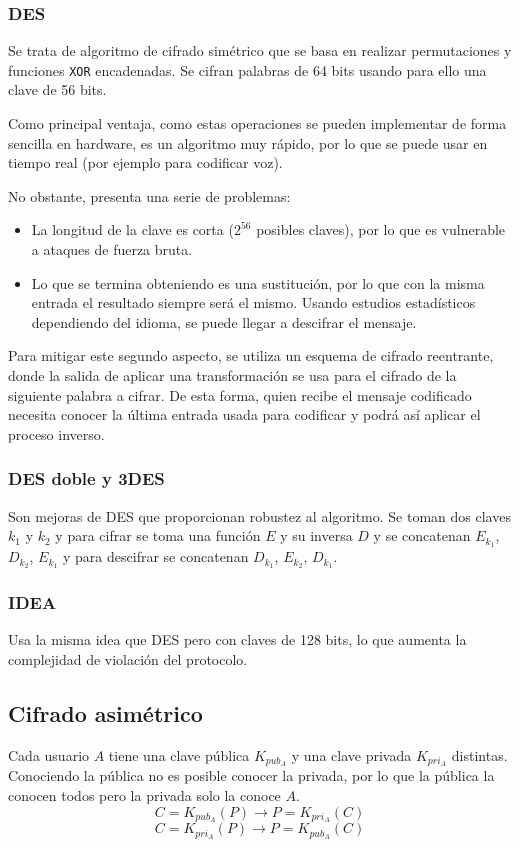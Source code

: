 \subsubsection{\acrfull{DES}}
Se trata de algoritmo de cifrado simétrico que se basa en realizar permutaciones y funciones \verb|XOR| encadenadas. Se cifran palabras de 64 bits usando para ello una clave de 56 bits.

Como principal ventaja, como estas operaciones se pueden implementar de forma sencilla en hardware, es un algoritmo muy rápido, por lo que se puede usar en tiempo real (por ejemplo para codificar voz). 

No obstante, presenta una serie de problemas:
\begin{itemize}
    \item La longitud de la clave es corta ($2^{56}$ posibles claves), por lo que es vulnerable a ataques de fuerza bruta.
    \item Lo que se termina obteniendo es una sustitución, por lo que con la misma entrada el resultado siempre será el mismo. Usando estudios estadísticos dependiendo del idioma, se puede llegar a descifrar el mensaje.
\end{itemize}

Para mitigar este segundo aspecto, se utiliza un esquema de cifrado reentrante, donde la salida de aplicar una transformación se usa para el cifrado de la siguiente palabra a cifrar. De esta forma, quien recibe el mensaje codificado necesita conocer la última entrada usada para codificar y podrá así aplicar el proceso inverso.

\subsubsection{DES doble y 3DES\@}
Son mejoras de DES que proporcionan robustez al algoritmo. Se toman dos claves $k_1$ y $k_2$ y para cifrar se toma una función $E$ y su inversa $D$ y se concatenan $E_{k_1}$, $D_{k_2}$, $E_{k_1}$ y para descifrar se concatenan $D_{k_1}$, $E_{k_2}$, $D_{k_1}$. 
\subsubsection{IDEA\@}
Usa la misma idea que DES pero con claves de 128 bits, lo que aumenta la complejidad de violación del protocolo. 

\subsection{Cifrado asimétrico}
Cada usuario $A$ tiene una clave pública $K_{pub_A}$ y una clave privada $K_{pri_A}$ distintas. Conociendo la pública no es posible conocer la privada, por lo que la pública la conocen todos pero la privada solo la conoce $A$. 
\begin{equation*}
    C = K_{pub_A}(P) \rightarrow P = K_{pri_A}(C)
\end{equation*}
\begin{equation*}
    C = K_{pri_A}(P) \rightarrow P = K_{pub_A}(C)
\end{equation*}

